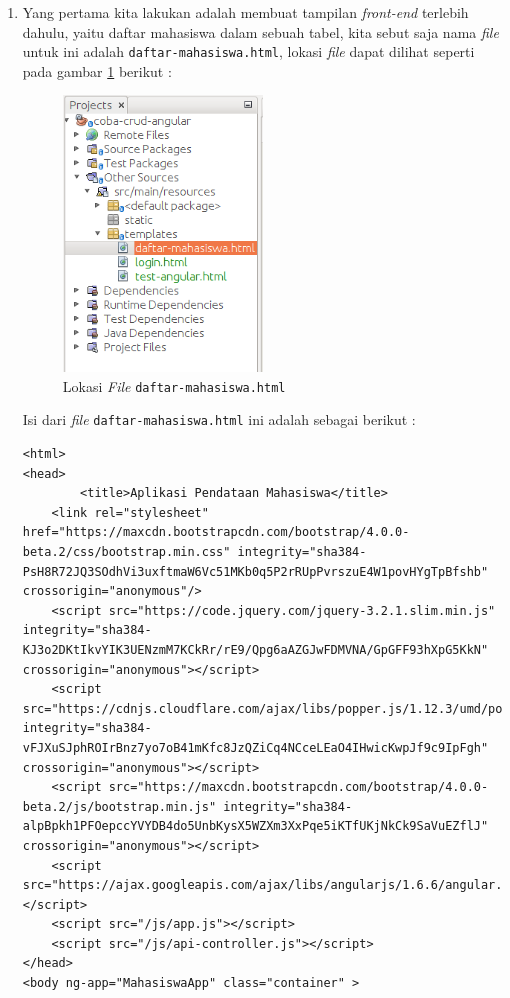 \begin{enumerate}
	\item Yang pertama kita lakukan adalah membuat tampilan \textit{front-end} terlebih dahulu, yaitu daftar mahasiswa dalam sebuah tabel, kita sebut saja nama \textit{file} untuk ini adalah \texttt{daftar-mahasiswa.html}, lokasi \textit{file} dapat dilihat seperti pada gambar \ref{fig:lokasi-daftar-mahasiswa} berikut :
	
	\begin{figure}[H]
		\centering
		\includegraphics[width=0.5\textwidth]{./resources/028-lokasi-daftar-mahasiswa}
		\caption{Lokasi \textit{File} \texttt{daftar-mahasiswa.html}}
		\label{fig:lokasi-daftar-mahasiswa}
	\end{figure}
	
	Isi dari \textit{file} \texttt{daftar-mahasiswa.html} ini adalah sebagai berikut :
	
	\begin{lstlisting}
<html>
<head>
        <title>Aplikasi Pendataan Mahasiswa</title>
    <link rel="stylesheet" href="https://maxcdn.bootstrapcdn.com/bootstrap/4.0.0-beta.2/css/bootstrap.min.css" integrity="sha384-PsH8R72JQ3SOdhVi3uxftmaW6Vc51MKb0q5P2rRUpPvrszuE4W1povHYgTpBfshb" crossorigin="anonymous"/>
    <script src="https://code.jquery.com/jquery-3.2.1.slim.min.js" integrity="sha384-KJ3o2DKtIkvYIK3UENzmM7KCkRr/rE9/Qpg6aAZGJwFDMVNA/GpGFF93hXpG5KkN" crossorigin="anonymous"></script>
    <script src="https://cdnjs.cloudflare.com/ajax/libs/popper.js/1.12.3/umd/popper.min.js" integrity="sha384-vFJXuSJphROIrBnz7yo7oB41mKfc8JzQZiCq4NCceLEaO4IHwicKwpJf9c9IpFgh" crossorigin="anonymous"></script>
    <script src="https://maxcdn.bootstrapcdn.com/bootstrap/4.0.0-beta.2/js/bootstrap.min.js" integrity="sha384-alpBpkh1PFOepccYVYDB4do5UnbKysX5WZXm3XxPqe5iKTfUKjNkCk9SaVuEZflJ" crossorigin="anonymous"></script>
    <script src="https://ajax.googleapis.com/ajax/libs/angularjs/1.6.6/angular.min.js"></script>
    <script src="/js/app.js"></script>
    <script src="/js/api-controller.js"></script>
</head>
<body ng-app="MahasiswaApp" class="container" >


\end{lstlisting}
\end{enumerate}

